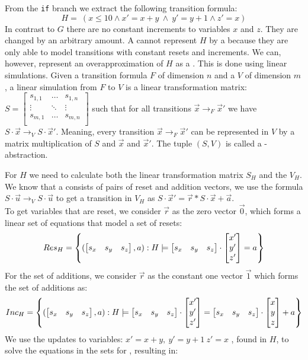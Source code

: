 From the \texttt{if} branch we extract the following transition formula:
\begin{equation*}
	H= \ (x \leq 10 \land x' = x + y\ \land\ y' = y + 1 \land z' = x)
\end{equation*} In contrast to $G$ there are no constant increments to variables $x$ and $z$. They are changed by an arbitrary amount. A \qvasr cannot represent $H$ by a  \qvasr because they are only able to model transitions with constant resets and increments. We can, however, represent an overapproximation of $H$ as a \qvasr. This is done using linear simulations. Given a transition formula $F$ of dimension $n$ and a \qvasr $V$ of dimension $m$, a linear simulation from $F$ to $V$ is a linear transformation matrix: 
$S = 
\begin{bmatrix}
	 s_{1 ,1} & \ldots & s_{1, n} \\
	\vdots & \ddots & \vdots \\
	s_{m ,1} & \ldots & s_{m, n} \\
\end{bmatrix}$ 
such that for all transitions $\vec{x} \rightarrow_F \vec{x}'$ we have $S\cdot\vec{x} \rightarrow_V S\cdot\vec{x}'$. Meaning, every transition $\vec{x} \rightarrow_F \vec{x}'$ can be represented in $V$ by a matrix multiplication of $S$ and $\vec{x}$ and $\vec{x}'$. The tuple $(S, V)$ is called a \qvasr-abstraction. \par For $H$ we need to calculate both the linear transformation matrix $S_H$ and the \qvasr $V_H$. We know that a \qvasr consists of pairs of reset and addition vectors, we use the formula $S \cdot \vec{u} \rightarrow_V S \cdot \vec{u}$ to get a transition in $V_H$ as $S\cdot\vec{x}' = \vec{r}*S\cdot\vec{x} + \vec{a}$. \\ To get variables that are reset, we consider $\vec{r}$ as the zero vector $\vec{0}$, which forms a linear set of equations that model a set of resets:
\begin{equation*}
	Res_H = \left\{ (\begin{bmatrix} s_x & s_y & s_z \end{bmatrix}, a) : H \models \begin{bmatrix} s_x & s_y & s_z \end{bmatrix} \cdot \begin{bmatrix} x' \\ y' \\ z' \end{bmatrix} = a \right\}	
\end{equation*}
For the set of additions, we consider $\vec{r}$ as the constant one vector $\vec{1}$ which forms the set of additions as:
\begin{equation*}
	Inc_H = \left\{(\begin{bmatrix} s_x & s_y & s_z \end{bmatrix}, a) : H \models \begin{bmatrix} s_x & s_y & s_z \end{bmatrix} \cdot \begin{bmatrix} x' \\ y' \\ z' \end{bmatrix} = \begin{bmatrix} s_x & s_y & s_z \end{bmatrix} \cdot \begin{bmatrix} x \\ y \\ z \end{bmatrix} + a\right\}	
\end{equation*}
We use the updates to variables: $x' = x + y, \ y'= y + 1\ z' = x$ , found in $H$, to solve the equations in the sets for \s, resulting in: 
